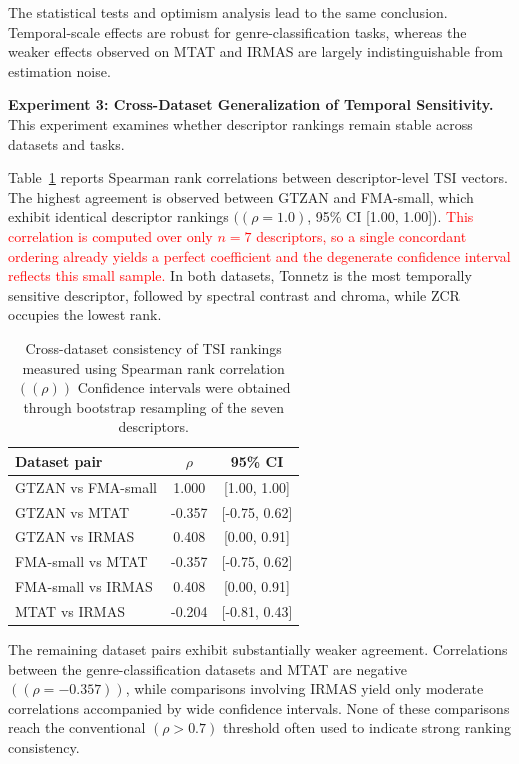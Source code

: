 \documentclass[runningheads]{llncs}
\begin{document}
The statistical tests and optimism analysis lead to the same conclusion. Temporal-scale effects are robust for genre-classification tasks, whereas the weaker effects observed on MTAT and IRMAS are largely indistinguishable from estimation noise.

\textbf{Experiment 3: Cross-Dataset Generalization of Temporal Sensitivity.} This experiment examines whether descriptor rankings remain stable across datasets and tasks.

Table~\ref{tab:consistency} reports Spearman rank correlations between descriptor-level TSI vectors. The highest agreement is observed between GTZAN and FMA-small, which exhibit identical descriptor rankings $((\rho=1.0)$, 95\% CI [1.00, 1.00]). \textcolor{red}{This correlation is computed over only $n=7$ descriptors, so a single concordant ordering already yields a perfect coefficient and the degenerate confidence interval reflects this small sample.} In both datasets, Tonnetz is the most temporally sensitive descriptor, followed by spectral contrast and chroma, while ZCR occupies the lowest rank.

\begin{table}[!htp]
\centering
\caption{Cross-dataset consistency of TSI rankings measured using Spearman rank correlation $((\rho))$ Confidence intervals were obtained through bootstrap resampling of the seven descriptors.}
\label{tab:consistency}
\begin{tabular}{|l|c|c|}
\hline
Dataset pair & $\rho$ & 95\% CI \\
\hline
GTZAN vs FMA-small  & 1.000  & [1.00, 1.00] \\
GTZAN vs MTAT       & -0.357 & [-0.75, 0.62] \\
GTZAN vs IRMAS      & 0.408  & [0.00, 0.91] \\
FMA-small vs MTAT   & -0.357 & [-0.75, 0.62] \\
FMA-small vs IRMAS  & 0.408  & [0.00, 0.91] \\
MTAT vs IRMAS       & -0.204 & [-0.81, 0.43] \\
\hline
\end{tabular}
\end{table}

The remaining dataset pairs exhibit substantially weaker agreement. Correlations between the genre-classification datasets and MTAT are negative $((\rho=-0.357))$, while comparisons involving IRMAS yield only moderate correlations accompanied by wide confidence intervals. None of these comparisons reach the conventional $(\rho>0.7)$ threshold often used to indicate strong ranking consistency.
\end{document}

